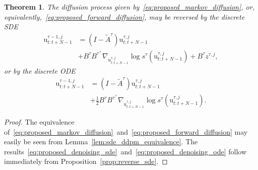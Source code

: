 \documentclass[letterpaper, 10 pt, conference]{IEEEconf}
\newtheorem{theorem}{Theorem}
\begin{document}
\begin{theorem} \label{thm:proposed_denoising}
    The diffusion process given by~\eqref{eq:proposed_markov_diffusion}, or, equivalently,~\eqref{eq:proposed_forward_diffusion}, may be reversed by the discrete SDE
    \begin{align} \label{eq:proposed_denoising_sde}
        \mathrm{u}_{t:t+N-1}^{\tau-1, j} &= (I - \tilde{A}^{\tau}) \mathrm{u}_{t:t+N-1}^{\tau, j} \nonumber\\
        &+ B^{\tau} B^{{\tau}^\top} \nabla_{\mathrm{u}_{t:t+N-1}^{\tau, j}} \log s^{\tau}(\mathrm{u}_{t:t+N-1}^{\tau, j}) + B^{\tau} z^{\tau, j},
    \end{align}
    or by the discrete ODE
    \begin{align} \label{eq:proposed_denoising_ode}
        \mathrm{u}_{t:t+N-1}^{\tau-1, j} &= (I - \tilde{A}^{\tau}) \mathrm{u}_{t:t+N-1}^{\tau, j} \nonumber\\
        &+ \frac{1}{2} B^{\tau} B^{{\tau}^\top} \nabla_{\mathrm{u}_{t:t+N-1}^{\tau, j}} \log s^{\tau}(\mathrm{u}_{t:t+N-1}^{\tau, j}).
    \end{align}
\end{theorem}
\begin{proof}
    The equivalence of~\eqref{eq:proposed_markov_diffusion}~and~\eqref{eq:proposed_forward_diffusion} may easily be seen from Lemma~\ref{lem:sde_ddpm_equivalence}.
    The results~\eqref{eq:proposed_denoising_sde}~and~\eqref{eq:proposed_denoising_ode} follow immediately from Proposition~\ref{prop:reverse_sde}.
\end{proof}
\end{document}
